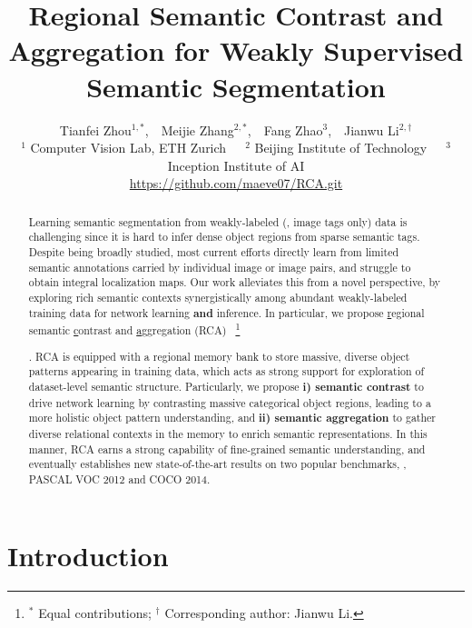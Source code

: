 \documentclass[10pt,twocolumn,letterpaper]{article}
\newcommand\blfootnote[1]{\begingroup
	\renewcommand\thefootnote{}\footnote{#1}\addtocounter{footnote}{-1}\endgroup
}
\begin{document}
\title{Regional Semantic Contrast and Aggregation for Weakly Supervised Semantic Segmentation}

\author{Tianfei Zhou$^{1,*}$,~~Meijie Zhang$^{2,*}$,~~Fang Zhao$^{3}$,~~Jianwu Li$^{2,\dagger}$\\
	\small{$^1$ Computer Vision Lab, ETH Zurich}~~~\small{$^2$ Beijing Institute of Technology}~~~\small{$^3$
		Inception Institute of AI}\\
	\small\url{https://github.com/maeve07/RCA.git}
}


\maketitle

\begin{abstract}

		\vspace{-.5em}
	Learning semantic segmentation from weakly-labeled (\eg, image tags only) data  is challenging since it is hard to infer dense object regions from sparse semantic tags. Despite being broadly studied, most current efforts directly learn from limited semantic annotations carried by individual image or image pairs, and struggle to obtain integral localization maps. Our work alleviates this from a novel perspective, by exploring rich {semantic contexts} synergistically among {abundant} weakly-labeled training data for network learning \textbf{and} inference. In particular, we propose \underline{r}egional semantic \underline{c}ontrast and \underline{a}ggregation (RCA)~\blfootnote{$^*$ Equal contributions; $^\dagger$ Corresponding author: Jianwu Li.}\!. RCA is equipped with a regional memory bank to store massive, diverse object patterns appearing in training data, which acts as strong support for exploration of dataset-level semantic structure. Particularly, we propose \textbf{i) semantic contrast} to drive network learning by contrasting massive categorical object regions, leading to a more holistic object pattern understanding,
	and \textbf{ii) semantic aggregation} to  gather diverse relational contexts in the memory to enrich semantic representations. In this manner, RCA earns a strong capability of fine-grained semantic understanding, and eventually establishes new state-of-the-art results on two popular benchmarks, \ie, PASCAL VOC 2012 and COCO 2014.
\vspace{-1em}

\end{abstract}

\section{Introduction}\label{sec:intro}
\end{document}

